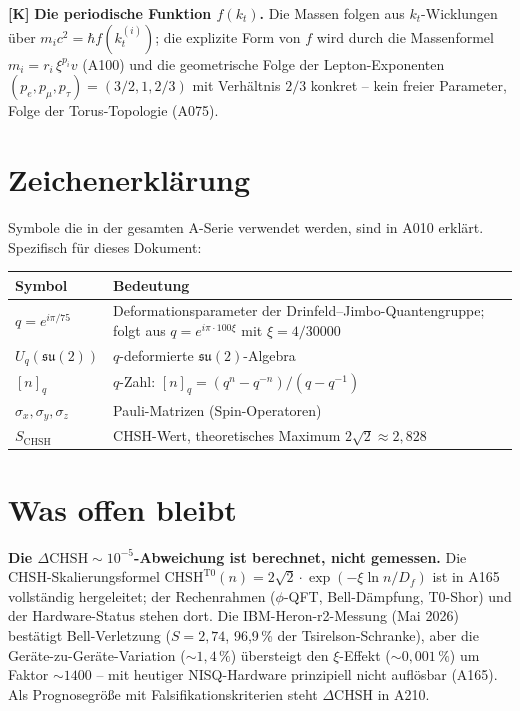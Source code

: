 \textbf{[K]} \textbf{Die periodische Funktion $f(k_t)$.} Die Massen folgen aus
$k_t$-Wicklungen über $m_ic^2=\hbar f(k_t^{(i)})$; die explizite Form von $f$
wird durch die Massenformel $m_i=r_i\,\xi^{p_i}v$ (A100) und die geometrische
Folge der Lepton-Exponenten $(p_e,p_\mu,p_\tau)=(3/2,1,2/3)$ mit Verhältnis
$2/3$ konkret -- kein freier Parameter, Folge der Torus-Topologie (A075).


\section{Zeichenerklärung}

Symbole die in der gesamten A-Serie verwendet werden, sind in A010 erklärt.
Spezifisch für dieses Dokument:

\begin{center}
\renewcommand{\arraystretch}{1.3}
{\small\begin{tabular}{lp{9cm}}
\toprule
Symbol & Bedeutung \\
\midrule
$q = e^{i\pi/75}$ & Deformationsparameter der Drinfeld--Jimbo-Quantengruppe;
  folgt aus $q = e^{i\pi\cdot100\xi}$ mit $\xi=4/30000$ \\
$U_q(\mathfrak{su}(2))$ & $q$-deformierte $\mathfrak{su}(2)$-Algebra \\
$[n]_q$ & $q$-Zahl: $[n]_q = (q^n-q^{-n})/(q-q^{-1})$ \\
$\sigma_x,\sigma_y,\sigma_z$ & Pauli-Matrizen (Spin-Operatoren) \\
$S_\text{CHSH}$ & CHSH-Wert, theoretisches Maximum $2\sqrt2\approx2{,}828$ \\
\bottomrule
\end{tabular}}
\renewcommand{\arraystretch}{1.0}
\end{center}

\section{Was offen bleibt}

\textbf{Die $\Delta\text{CHSH}\sim10^{-5}$-Abweichung ist berechnet, nicht
gemessen.} Die CHSH-Skalierungsformel
$\text{CHSH}^{\text{T0}}(n)=2\sqrt2\cdot\exp(-\xi\ln n/D_f)$ ist in A165
vollständig hergeleitet; der Rechenrahmen ($\phi$-QFT, Bell-Dämpfung, T0-Shor)
und der Hardware-Status stehen dort. Die IBM-Heron-r2-Messung (Mai 2026) bestätigt
Bell-Verletzung ($S=2{,}74$, 96{,}9\,\% der Tsirelson-Schranke), aber die
Geräte-zu-Geräte-Variation ($\sim1{,}4\,\%$) übersteigt den $\xi$-Effekt
($\sim0{,}001\,\%$) um Faktor $\sim1400$ -- mit heutiger NISQ-Hardware prinzipiell
nicht auflösbar (A165). Als Prognosegröße mit Falsifikationskriterien steht
$\Delta\text{CHSH}$ in A210.

